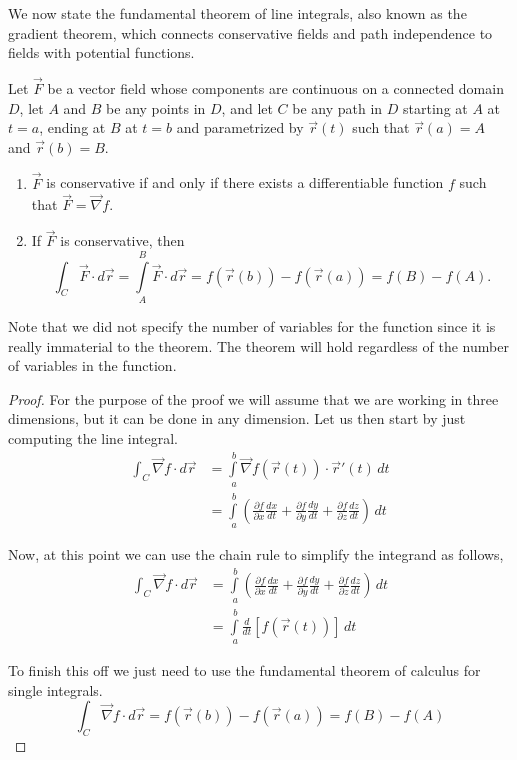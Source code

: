 We now state the fundamental theorem of line integrals, also known as the gradient theorem, which connects conservative fields and path independence to fields with potential functions. 

\begin{theorem}\label{thm:FTofLineIntegrals}
Let $\vec F$ be a vector field whose components are continuous on a connected domain $D$, let $A$ and $B$ be any points in $D$, and let $C$ be any path in $D$ starting at $A$ at $t=a$,  ending at $B$ at $t=b$ and parametrized by $\vec{r}(t)$ such that $\vec{r}(a)=A$ and  $\vec{r}(b)=B$. 
\begin{enumerate}
	\item $\vec F$ is conservative if and only if there exists a differentiable function $f$ such that $\vec F = \vec{\nabla} f$. 
	\item	If $\vec F$ is conservative, then 
	$$\int_C\vec F\cdot d\vec r = \int\limits_A^B \vec F\cdot d\vec r =f\left( {\vec r\left( b \right)} \right) - f\left( {\vec r\left( a \right)} \right)= f(B) - f(A).$$
\end{enumerate}
\end{theorem}

Note that we did not specify the number of variables for the function since it is really immaterial to the theorem. The theorem will hold regardless of the number of variables in the function.


\ifanalysis
\begin{proof}
For the purpose of the proof we will assume that we are working in three dimensions, but it can be done in any dimension. Let us then start by just computing the line integral.
\begin{align*}
\int_C{{\vec{\nabla} f\cdot d\vec r}} & = \int\limits_{{\,a}}^{{\,b}}{{\vec{\nabla} f\left( {\vec r\left( t \right)} \right)\cdot \vec r'\left( t \right)\,dt}}\\ &  = \int\limits_{{\,a}}^{{\,b}}{{\left( {\frac{{\partial f}}{{\partial x}}\frac{{dx}}{{dt}} + \frac{{\partial f}}{{\partial y}}\frac{{dy}}{{dt}} + \frac{{\partial f}}{{\partial z}}\frac{{dz}}{{dt}}} \right)\,dt}}
\end{align*}

Now, at this point we can use the chain rule to simplify the integrand as follows,
\begin{align*}\int_C{{\vec{\nabla} f\cdot d\vec r}} & = \int\limits_{{\,a}}^{{\,b}}{{\left( {\frac{{\partial f}}{{\partial x}}\frac{{dx}}{{dt}} + \frac{{\partial f}}{{\partial y}}\frac{{dy}}{{dt}} + \frac{{\partial f}}{{\partial z}}\frac{{dz}}{{dt}}} \right)\,dt}}\\ &  = \int\limits_{{\,a}}^{{\,b}}{{\frac{d}{{dt}}\left[ {f\left( {\vec r\left( t \right)} \right)} \right]\,dt}}
\end{align*}

To finish this off we just need to use the fundamental theorem of calculus for single integrals.
$$
\int_C{{\vec{\nabla} f\cdot d\vec r}} = f\left( {\vec r\left( b \right)} \right) - f\left( {\vec r\left( a \right)} \right)=f(B)-f(A)
$$
\end{proof}
\fi

